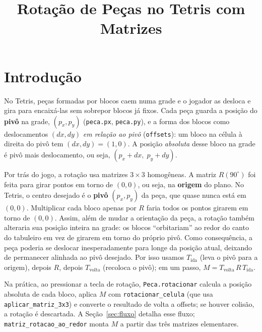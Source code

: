 \documentclass[conference,onecolumn]{IEEEtran}
\begin{document}
\title{Rotação de Peças no Tetris com Matrizes}

\author{
}

\maketitle

\section{Introdução}

No Tetris, peças formadas por blocos caem numa grade e o jogador as desloca e gira para encaixá-las sem sobrepor blocos já fixos. Cada peça guarda a posição do \textbf{pivô} na grade, $(p_x,p_y)$ (\texttt{peca.px}, \texttt{peca.py}), e a forma dos blocos como deslocamentos $(dx,dy)$ \emph{em relação ao pivô} (\texttt{offsets}): um bloco na célula à direita do pivô tem $(dx,dy){=}(1,0)$. A posição \emph{absoluta} desse bloco na grade é pivô mais deslocamento, ou seja, $(p_x{+}dx,\; p_y{+}dy)$.

Por trás do jogo, a rotação usa matrizes $3{\times}3$ homogêneas. A matriz $R(90^\circ)$ foi feita para girar pontos em torno de $(0,0)$, ou seja, na \textbf{origem} do plano. No Tetris, o centro desejado é o \textbf{pivô} $(p_x,p_y)$ da peça, que quase nunca está em $(0,0)$. Multiplicar cada bloco apenas por $R$ faria todos os pontos girarem em torno de $(0,0)$. Assim, além de mudar a orientação da peça, a rotação também alteraria sua posição inteira na grade: os blocos “orbitariam” ao redor do canto do tabuleiro em vez de girarem em torno do próprio pivô. Como consequência, a peça poderia se deslocar inesperadamente para longe da posição atual, deixando de permanecer alinhada ao pivô desejado. Por isso usamos $T_{\text{ida}}$ (leva o pivô para a origem), depois $R$, depois $T_{\text{volta}}$ (recoloca o pivô); em um passo, $M=T_{\text{volta}}\,R\,T_{\text{ida}}$.

Na prática, ao pressionar a tecla de rotação, \texttt{Peca.rotacionar} calcula a posição absoluta de cada bloco, aplica $M$ com \texttt{rotacionar\_celula} (que usa \texttt{aplicar\_matriz\_3x3}) e converte o resultado de volta a offsets; se houver colisão, a rotação é descartada. A Seção~\ref{sec:fluxo} detalha esse fluxo; \texttt{matriz\_rotacao\_ao\_redor} monta $M$ a partir das três matrizes elementares.
\end{document}
